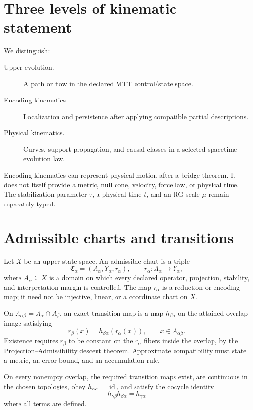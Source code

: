 \documentclass[11pt]{article}
\begin{document}
\tableofcontents

\section{Three levels of kinematic statement}

We distinguish:
\begin{description}
\item[Upper evolution.] A path or flow in the declared MTT control/state
space.
\item[Encoding kinematics.] Localization and persistence after applying
compatible partial descriptions.
\item[Physical kinematics.] Curves, support propagation, and causal classes in
a selected spacetime evolution law.
\end{description}

Encoding kinematics can represent physical motion after a bridge theorem. It
does not itself provide a metric, null cone, velocity, force law, or physical
time. The stabilization parameter $\tau$, a physical time $t$, and an RG scale
$\mu$ remain separately typed.

\section{Admissible charts and transitions}

Let $X$ be an upper state space. An admissible chart is a triple
\[
 \mathfrak C_\alpha=(A_\alpha,Y_\alpha,r_\alpha),
 \qquad r_\alpha:A_\alpha\to Y_\alpha,
\]
where $A_\alpha\subseteq X$ is a domain on which every declared operator,
projection, stability, and interpretation margin is controlled. The map
$r_\alpha$ is a reduction or encoding map; it need not be injective, linear,
or a coordinate chart on $X$.

On $A_{\alpha\beta}=A_\alpha\cap A_\beta$, an exact transition map is a map
$h_{\beta\alpha}$ on the attained overlap image satisfying
\[
 r_\beta(x)=h_{\beta\alpha}(r_\alpha(x)),
 \qquad x\in A_{\alpha\beta}.
\]
Existence requires $r_\beta$ to be constant on the $r_\alpha$ fibers inside
the overlap, by the Projection--Admissibility descent theorem. Approximate
compatibility must state a metric, an error bound, and an accumulation rule.

\begin{assumption}\label{ass:charts}
On every nonempty overlap, the required transition maps exist, are continuous
in the chosen topologies, obey $h_{\alpha\alpha}=\operatorname{id}$, and satisfy
the cocycle identity
\[
 h_{\gamma\beta}h_{\beta\alpha}=h_{\gamma\alpha}
\]
where all terms are defined.
\end{assumption}
\end{document}
